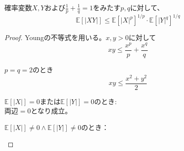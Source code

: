     確率変数$X, Y$および$\frac{1}{p}+ \frac{1}{q}= 1$をみたす$p, q$に対して、
\begin{equation}
    \mathbb{E}[|XY|]\le \mathbb{E}[|X|^p]^{1/p}\cdot \mathbb{E}[|Y|^q]^{1/q}
\end{equation}

\begin{proof}
    Youngの不等式を用いる。$x, y> 0$に対して
\begin{equation}
    xy\le \frac{x^p}{p}+ \frac{x^q}{q}
\end{equation}

    $p= q= 2$のとき
\begin{equation}
    xy\le \frac{x^2+ y^2}{2}
\end{equation}

\begin{enumerate_roman}
    \item $\mathbb{E}[|X|]= 0$または$\mathbb{E}[|Y|]= 0$のとき:\\
    両辺$= 0$となり成立。
    \item $\mathbb{E}[|X|]\ne 0\land \mathbb{E}[|Y|]\ne 0$のとき：\\

\end{enumerate_roman}
\end{proof}